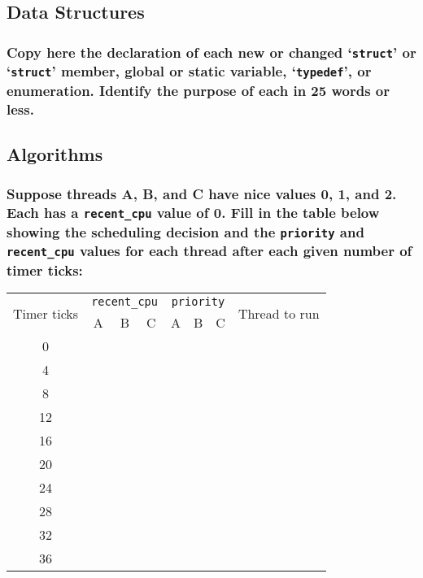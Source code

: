 \documentclass[sigconf, nonacm]{acmart}
\begin{document}
        \subsection{Data Structures}
            
            \subsubsection{Copy here the declaration of each new or changed `\texttt{struct}' or `\texttt{struct}' member, global or static variable, `\texttt{typedef}', or enumeration. Identify the purpose of each in 25 words or less. } 

        \subsection{Algorithms}

            \subsubsection{Suppose threads A, B, and C have nice values 0, 1, and 2. Each has a \texttt{recent\_cpu} value of 0. Fill in the table below showing the scheduling decision and the \texttt{priority} and \texttt{recent\_cpu} values for each thread after each given number of timer ticks:} 
                \begin{center}
                    \begin{tabular}{|c|c|c|c|c|c|c|c|}
                        \hline
                        \multirow{2}{*}{Timer ticks} & \multicolumn{3}{c|}{\texttt{recent\_cpu}} & \multicolumn{3}{c|}{\texttt{priority}} & \multirow{2}{*}{Thread to run} \\
                        \cline{2-7}
                        & A & B & C & A & B & C & \\
                        \hline
                        0 &  &  &  &  &  &  & \\
                        \hline
                        4 &  &  &  &  &  &  & \\
                        \hline
                        8 &  &  &  &  &  &  & \\
                        \hline
                        12 &  &  &  &  &  &  & \\
                        \hline
                        16 &  &  &  &  &  &  & \\
                        \hline
                        20 &  &  &  &  &  &  & \\
                        \hline
                        24 &  &  &  &  &  &  & \\
                        \hline
                        28 &  &  &  &  &  &  & \\
                        \hline
                        32 &  &  &  &  &  &  & \\
                        \hline
                        36 &  &  &  &  &  &  & \\
                        \hline
                    \end{tabular}
                \end{center}
            
\end{document}
